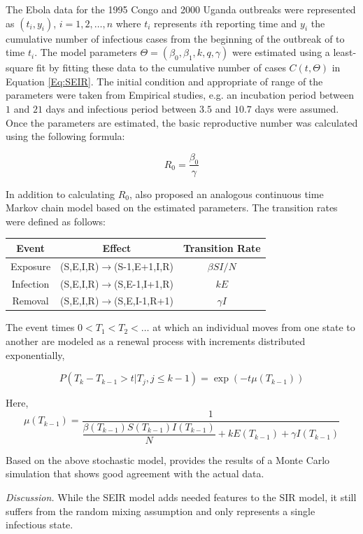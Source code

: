 \documentclass[10pt, journal,onecolumn]{IEEEtran}
\begin{document}
The Ebola data for the 1995 Congo and 2000 Uganda outbreaks were represented as $(t_i,y_i)$,
$i=1,2,\ldots,n$ where $t_i$ represents $i$th reporting time and $y_i$ the cumulative number of
infectious cases from the beginning of the outbreak of to time $t_i$.  The model parameters
$\Theta=(\beta_0,\beta_1,k,q,\gamma)$ were estimated using a least-square fit by fitting these data to
the cumulative number of cases $C(t,\Theta)$ in Equation \ref{Eq:SEIR}. The initial condition and
appropriate of range of the parameters were taken from Empirical studies, e.g. an incubation period
between $1$ and $21$ days and infectious period between $3.5$ and $10.7$ days were assumed. Once the
parameters are estimated, the basic reproductive number was calculated using the following formula:

\begin{equation}
R_0 = \dfrac{\beta_0}{\gamma}
\end{equation}


In addition to calculating $R_0$, \citep{chowell2004basic} also proposed an analogous continuous time Markov chain model based on the estimated parameters. The transition rates were defined as follows:

\begin{center}
\begin{tabular}{|c|c|c|}
\hline
Event & Effect & Transition Rate\tabularnewline
\hline
\hline
Exposure & (S,E,I,R)$\to$(S-1,E+1,I,R) & $\beta SI/N$\tabularnewline
\hline
Infection & (S,E,I,R)$\to$(S,E-1,I+1,R) & $kE$\tabularnewline
\hline
Removal & (S,E,I,R)$\to$(S,E,I-1,R+1) & $\gamma I$\tabularnewline
\hline
\end{tabular}
\end{center}

The event times $0<T_1<T_2<\ldots$ at which an individual moves from one state to another are modeled as a renewal process with increments distributed exponentially,

\begin{equation}
P(T_k-T_{k-1} > t | T_j, j\leq k-1) = \exp(-t \mu (T_{k-1}) )
\end{equation}

Here,
\[
\mu (T_{k-1}) = \frac{1}{\dfrac{\beta(T_{k-1}) S(T_{k-1}) I(T_{k-1})}{N} + k E(T_{k-1}) + \gamma I(T_{k-1})}
\]

Based on the above stochastic model, \citep{chowell2004basic} provides the results of a Monte Carlo
simulation that shows good agreement with the actual data.

\textit{Discussion.} While the SEIR model adds needed features to the SIR model, it still suffers
from the random mixing assumption and only represents a single infectious state.
\end{document}
